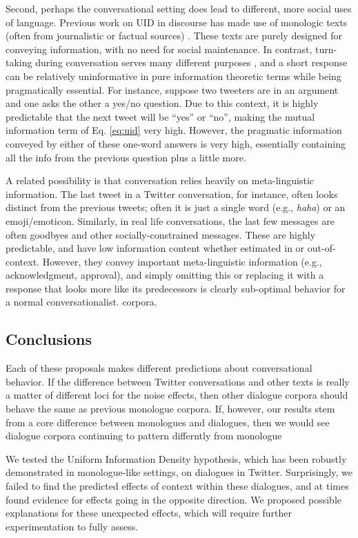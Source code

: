 \documentclass[11pt,letterpaper]{article}
\begin{document}
Second, perhaps the conversational setting does lead to different, more social uses of language. Previous work on UID in discourse has made use of monologic texts (often from journalistic or factual sources) \cite{genzel2002,genzel2003,qian2012}. These texts are purely designed for conveying information, with no need for social maintenance. In contrast, turn-taking during conversation serves many different purposes \cite{clark1996}, and a short response can be relatively uninformative in pure information theoretic terms while being pragmatically essential. For instance, suppose two tweeters are in an argument and one asks the other a yes/no question.  Due to this context, it is highly predictable that the next tweet will be ``yes'' or ``no'', making the mutual information term of Eq. \ref{eq:uid} very high.  However, the pragmatic information conveyed by either of these one-word answers is very high, essentially containing all the info from the previous question plus a little more.

A related possibility is that conversation relies heavily on meta-linguistic information.  The last tweet in a Twitter conversation, for instance, often looks distinct from the previous tweets; often it is just a single word (e.g., {\it haha}) or an emoji/emoticon.  Similarly, in real life conversations, the last few messages are often goodbyes and other socially-constrained messages.  These are highly predictable, and have low information content whether estimated in or out-of-context.  However, they convey important meta-linguistic information (e.g., acknowledgment, approval), and simply omitting this or replacing it with a response that looks more like its predecessors is clearly sub-optimal behavior for a normal conversationalist.
corpora.


\subsection{Conclusions}


Each of these proposals makes different predictions about conversational behavior.  If the difference between Twitter conversations and other texts is really a matter of different loci for the noise effects, then other dialogue corpora should behave the same as previous monologue corpora.  If, however, our results stem from a core difference between monologues and dialogues, then we would see dialogue corpora continuing to pattern differntly from monologue 

We tested the Uniform Information Density hypothesis, which has been robustly demonstrated in monologue-like settings, on dialogues in Twitter. Surprisingly, we failed to find the predicted effects of context within these dialogues, and at times found evidence for effects going in the opposite direction.  We proposed possible explanations for these unexpected effects, which will require further experimentation to fully assess.

%

\newpage


\end{document}
